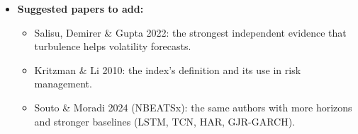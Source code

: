 \documentclass{article}
\begin{document}
\begin{itemize}
\begin{itemize}
\end{itemize}

\item \textbf{Suggested papers to add:}

\begin{itemize}

\item Salisu, Demirer \& Gupta 2022: the strongest independent evidence that turbulence helps volatility forecasts.

\item Kritzman \& Li 2010: the index's definition and its use in risk management.

\item Souto \& Moradi 2024 (NBEATSx): the same authors with more horizons and stronger baselines (LSTM, TCN, HAR, GJR-GARCH).

\end{itemize}

\end{itemize}
\end{document}
